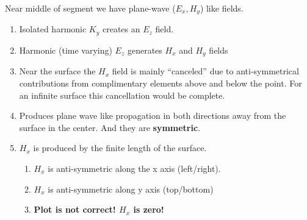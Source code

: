 \documentclass{article}
\newcommand{\0}{\varnothing}
\begin{document}
\begin{minipage}{0.45\textwidth}
Near middle of segment we have plane-wave ($E_x, H_y$) like fields. 
\begin{enumerate}
	\item Isolated harmonic $K_y$ creates an $E_z$ field.
	\item Harmonic (time varying) $E_z$ generates $H_x$ and $H_y$ fields
	\item Near the surface the $H_x$ field is mainly ``canceled'' due to anti-symmetrical contributions from complimentary elements above and below the point. For an infinite surface this cancellation would be complete.
	\item Produces plane wave like propagation in both directions away from the surface in the center. And they are {\bf symmetric}.
	\item $H_x$ is produced by the finite length of the surface.
	\begin{enumerate}
		\item $H_x$ is anti-symmetric along the x axis (left/right).
		\item $H_x$ is anti-symmetric along y axis (top/bottom)
		\item {\bf Plot is not correct! $H_x$ is zero!}
	\end{enumerate}
\end{enumerate}
\end{minipage}
\end{document}
